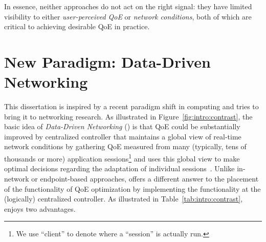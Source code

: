 \begin{itemize}

\end{itemize}

In essence, neither approaches do not act on the right signal: they have
limited visibility to either {\em user-perceived QoE} or {\em network conditions}, 
both of which are critical to achieving desirable QoE in practice. 




\section{New Paradigm: Data-Driven Networking}

This dissertation is inspired by a recent paradigm shift in computing and tries to
bring it to networking research. 
As illustrated in Figure~\ref{fig:intro:contrast}, the basic idea of 
{\em Data-Driven Networking} ({\em \ddn}) is that QoE could be 
substantially improved by centralized controller that maintains a global view of 
real-time network conditions by gathering  QoE measured from many (typically, 
tens of thousands or more) application sessions\footnote{We use ``client'' to 
denote where a ``session'' is actually run.} and uses this global view to make  
optimal decisions regarding the adaptation of individual 
sessions~\cite{ddn-comsnet}.
Unlike in-network or endpoint-based approaches, \ddn offers a different answer
to the placement of the functionality of QoE optimization by implementing the 
functionality at the  (logically) centralized controller.
As illustrated in Table~\ref{tab:intro:contrast}, \ddn enjoys two advantages.

